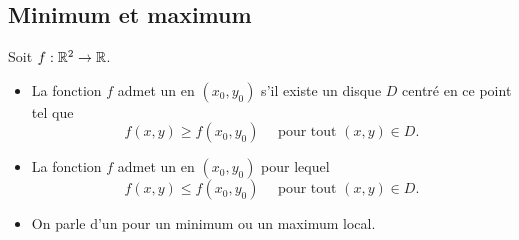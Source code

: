 \subsection{Minimum et maximum}

\begin{definition}{}{}
	Soit $f : \mathbb{R}^2 \to \mathbb{R}$.
	\begin{itemize}
		\item La fonction $f$ admet un  en $(x_0,y_0)$ s'il existe un disque $D$ centré en ce point tel que 
		$$ f(x,y) \ge f(x_0,y_0) \quad \text{ pour tout } (x,y) \in D.$$
		\item La fonction $f$ admet un  en $(x_0,y_0)$  pour lequel 
		$$f(x,y) \le f(x_0,y_0) \quad \text{ pour tout } (x,y) \in D.$$
		\item On parle d'un  pour un minimum ou un maximum local.
	\end{itemize}
\end{definition}


